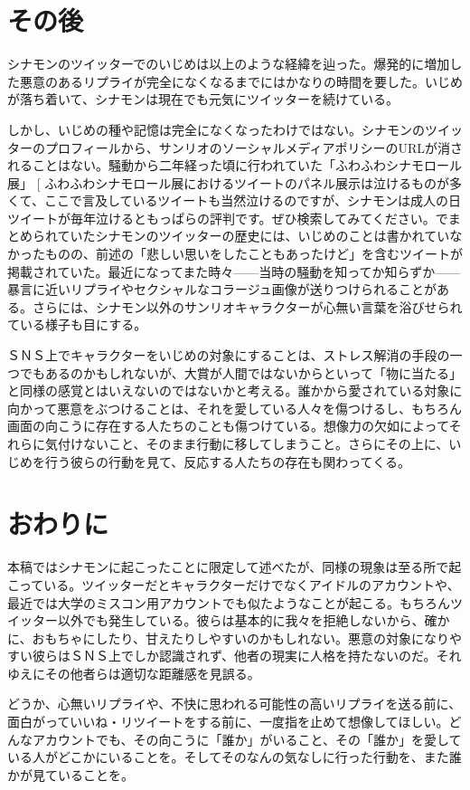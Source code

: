 \documentclass[b5j,twoside,twocolumn]{utarticle}
\makeatletter
\def\yakuchu{%
\@ifnextchar[\@xfootnote %
{\stepcounter{yakuchu}%
\protected@xdef\@thefnmark{\theyakuchu}%
\@footnotemark\@footnotetext}}
\makeatother
\begin{document}
\section*{その後}
シナモンのツイッターでのいじめは以上のような経緯を辿った。爆発的に増加した悪意のあるリプライが完全になくなるまでにはかなりの時間を要した。いじめが落ち着いて、シナモンは現在でも元気にツイッターを続けている。


しかし、いじめの種や記憶は完全になくなったわけではない。シナモンのツイッターのプロフィールから、サンリオのソーシャルメディアポリシーのURLが消されることはない。騒動から二年経った頃に行われていた「ふわふわシナモロール展」\yakuchu{ふわふわシナモロール展におけるツイートのパネル展示は泣けるものが多くて、ここで言及しているツイートも当然泣けるのですが、シナモンは成人の日ツイートが毎年泣けるともっぱらの評判です。ぜひ検索してみてください。}でまとめられていたシナモンのツイッターの歴史には、いじめのことは書かれていなかったものの、前述の「悲しい思いをしたこともあったけど」を含むツイートが掲載されていた。最近になってまた時々------当時の騒動を知ってか知らずか------暴言に近いリプライやセクシャルなコラージュ画像が送りつけられることがある。さらには、シナモン以外のサンリオキャラクターが心無い言葉を浴びせられている様子も目にする。


ＳＮＳ上でキャラクターをいじめの対象にすることは、ストレス解消の手段の一つでもあるのかもしれないが、大賞が人間ではないからといって「物に当たる」と同様の感覚とはいえないのではないかと考える。誰かから愛されている対象に向かって悪意をぶつけることは、それを愛している人々を傷つけるし、もちろん画面の向こうに存在する人たちのことも傷つけている。想像力の欠如によってそれらに気付けないこと、そのまま行動に移してしまうこと。さらにその上に、いじめを行う彼らの行動を見て、反応する人たちの存在も関わってくる。


\section{おわりに}
本稿ではシナモンに起こったことに限定して述べたが、同様の現象は至る所で起こっている。ツイッターだとキャラクターだけでなくアイドルのアカウントや、最近では大学のミスコン用アカウントでも似たようなことが起こる。もちろんツイッター以外でも発生している。彼らは基本的に我々を拒絶しないから、確かに、おもちゃにしたり、甘えたりしやすいのかもしれない。悪意の対象になりやすい彼らはＳＮＳ上でしか認識されず、他者の現実に人格を持たないのだ。それゆえにその他者らは適切な距離感を見誤る。


どうか、心無いリプライや、不快に思われる可能性の高いリプライを送る前に、面白がっていいね・リツイートをする前に、一度指を止めて想像してほしい。どんなアカウントでも、その向こうに「誰か」がいること、その「誰か」を愛している人がどこかにいることを。そしてそのなんの気なしに行った行動を、また誰かが見ていることを。\\ \\
\theendnotes
\end{document}
